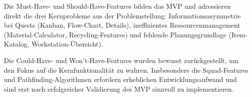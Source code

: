 Die Must-Have- und Should-Have-Features bilden das \ac{MVP} und adressieren direkt die drei Kernprobleme aus der Problemstellung: Informationsasymmetrie bei Quests (Kanban, Flow-Chart, Details), ineffizientes Ressourcenmanagement (Material-Calculator, Recycling-Features) und fehlende Planungsgrundlage (Item-Katalog, Workstation-Übersicht).

Die Could-Have- und Won't-Have-Features wurden bewusst zurückgestellt, um den Fokus auf die Kernfunktionalität zu wahren. Insbesondere die Squad-Features und Pathfinding-Algorithmen erfordern erheblichen Entwicklungsaufwand und sind erst nach erfolgreicher Validierung des \ac{MVP} sinnvoll zu implementieren.








